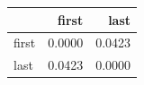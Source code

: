 \begin{tabular}{lrr}
\toprule
 & first & last \\
\midrule
first & 0.0000 & 0.0423 \\
last & 0.0423 & 0.0000 \\
\bottomrule
\end{tabular}
